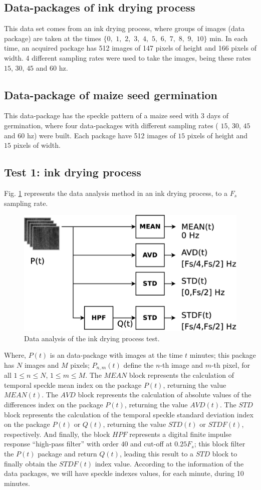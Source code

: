 \documentclass[review]{elsarticle}
\begin{document}
\subsection{Data-packages of ink drying process}
\label{subsec:data1}
 This data set comes from an ink drying process, 
 where groups of images (data package) are taken at the times
 $\{0,$ $1,$ $2,$ $3,$ $4,$ $5,$ $6,$ $7,$ $8,$ $9,$ $10\}$ min. 
 In each time, an acquired package  has 512 images of 147 pixels of height and 166 pixels of width.
4 different sampling rates were used to take the images,
 being these rates $15$, $30$, $45$ and $60$ hz.

\subsection{Data-package of maize seed germination}
\label{subsec:data2}
 This data-package has the speckle pattern of a maize seed with 3 days of germination,
 where four data-packages with different sampling rates ( $15$, $30$, $45$ and $60$ hz)  
were built.
Each package have 512 images of $15$ pixels of height and $15$ pixels of width.
 

\subsection{Test 1: ink drying process}
\label{subsec:test1}
Fig. \ref{fig:test1} represents the data analysis method in an ink drying process, 
to a $F_s$ sampling rate.
\begin{figure}[ht!]
\centering
\includegraphics[width=0.55\columnwidth]{test1.eps}
\caption{Data analysis of the ink drying process test.}
\label{fig:test1}
\end{figure}
Where, $P(t)$ is an data-package with  images at the time $t$ minutes; 
this package has $N$ images and $M$ pixels; $P_{n,m}(t)$ 
define the $n$-th image and $m$-th pixel, for all $1 \leq n \leq N$, $1 \leq m \leq M$.
The $MEAN$ block represents the calculation of temporal speckle mean index on 
the package $P(t)$, returning the value $MEAN(t)$. 
The $AVD$ block represents the calculation of  absolute values of the differences index on
the package $P(t)$, returning the value $AVD(t)$. 
The $STD$ block represents the calculation of the temporal speckle standard deviation index on 
the package $P(t)$ or $Q(t)$, returning the value $STD(t)$ or $STDF(t)$, respectively.
And finally,
the block \hyperref[sec:stdf]{$HPF$} represents a digital finite impulse response ``high-pass filter'' 
with order $40$ and cut-off at $0.25F_s$; this block filter the $P(t)$ package and return $Q(t)$,
leading this result to a $STD$ block to finally obtain the $STDF(t)$ index value.
According to the information of the data packages, 
we will have speckle indexes values, for each minute, during 10 minutes.
\end{document}
